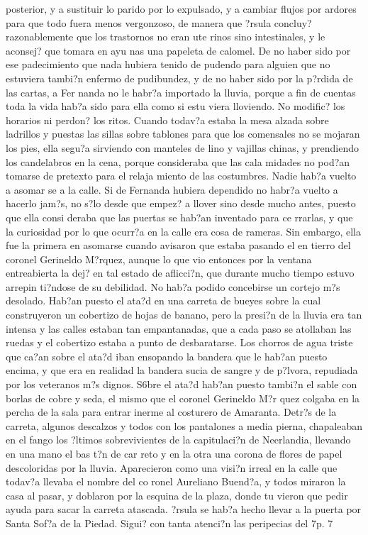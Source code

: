 posterior, y a sustituir lo parido por lo expulsado, y a cambiar flujos por ardores para que todo fuera menos vergonzoso, de manera que ?rsula concluy? razonablemente que los trastornos no eran ute rinos sino intestinales, y le aconsej? que tomara en ayu nas una papeleta de calomel. De no haber sido por ese padecimiento que nada hubiera tenido de pudendo para alguien que no estuviera tambi?n enfermo de pudibundez, y de no haber sido por la p?rdida de las cartas, a Fer nanda no le habr?a importado la lluvia, porque a fin de cuentas toda la vida hab?a sido para ella como si estu viera lloviendo. No modific? los horarios ni perdon? los ritos. Cuando todav?a estaba la mesa alzada sobre ladrillos y puestas las sillas sobre tablones para que los comensales no se mojaran los pies, ella segu?a sirviendo con manteles de lino y vajillas chinas, y prendiendo los candelabros en la cena, porque consideraba que las cala midades no pod?an tomarse de pretexto para el relaja miento de las costumbres. Nadie hab?a vuelto a asomar se a la calle. Si de Fernanda hubiera dependido no habr?a vuelto a hacerlo jam?s, no s?lo desde que empez? a llover sino desde mucho antes, puesto que ella consi deraba que las puertas se hab?an inventado para ce rrarlas, y que la curiosidad por lo que ocurr?a en la calle era cosa de rameras. Sin embargo, ella fue la primera en asomarse cuando avisaron que estaba pasando el en tierro del coronel Gerineldo M?rquez, aunque lo que vio entonces por la ventana entreabierta la dej? en tal estado de aflicci?n, que durante mucho tiempo estuvo arrepin ti?ndose de su debilidad. No hab?a podido concebirse un cortejo m?s desolado. Hab?an puesto el ata?d en una carreta de bueyes sobre la cual construyeron un cobertizo de hojas de banano, pero la presi?n de la lluvia era tan intensa y las calles estaban tan empantanadas, que a cada paso se atollaban las ruedas y el cobertizo estaba a punto de desbaratarse. Los chorros de agua triste que ca?an sobre el ata?d iban ensopando la bandera que le hab?an puesto encima, y que era en realidad la bandera sucia de sangre y de p?lvora, repudiada por los veteranos m?s dignos. S6bre el ata?d hab?an puesto tambi?n el sable con borlas de cobre y seda, el mismo que el coronel Gerineldo M?r quez colgaba en la percha de la sala para entrar inerme al costurero de Amaranta. Detr?s de la carreta, algunos descalzos y todos con los pantalones a media pierna, chapaleaban en el fango los ?ltimos sobrevivientes de la capitulaci?n de Neerlandia, llevando en una mano el bas t?n de car reto y en la otra una corona de flores de papel descoloridas por la lluvia. Aparecieron como una visi?n irreal en la calle que todav?a llevaba el nombre del co ronel Aureliano Buend?a, y todos miraron la casa al pasar, y doblaron por la esquina de la plaza, donde tu vieron que pedir ayuda para sacar la carreta atascada. ?rsula se hab?a hecho llevar a la puerta por Santa Sof?a de la Piedad. Sigui? con tanta atenci?n las peripecias del 7p. 7

